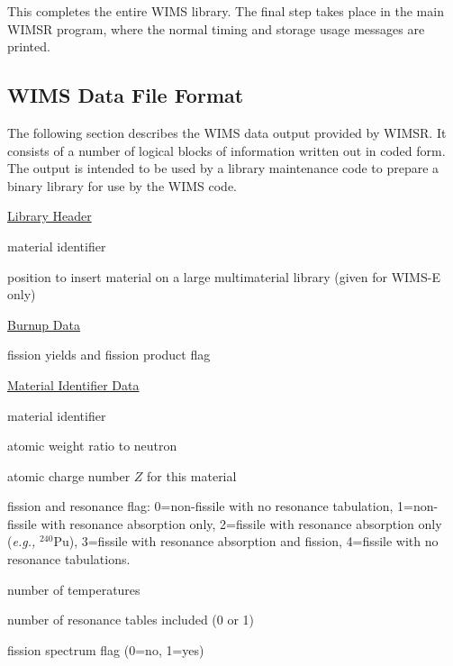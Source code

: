 This completes the entire WIMS library.  The final step takes place
in the main WIMSR program, where the normal timing and storage
usage messages are printed.


\subsection{WIMS Data File Format}
\label{ssWIMSR_fileformat}

The following section describes the WIMS data output provided
by WIMSR.  It consists of a number of logical blocks of
information written out in coded form.  The output is intended
to be used by a library maintenance code to prepare a binary
library for use by the WIMS code.

\noindent

\underline{Library Header }

\begin{list}{}{\setlength{\leftmargin}{2in}\setlength{\labelwidth}{1.7in}}
\item[\cword{NFID}\hfill] material identifier
\item[\cword{NPOS}\hfill] position to insert material on a
    large multimaterial library (given for WIMS-E only)
\end{list}

\noindent
\underline{Burnup Data }

\begin{list}{}{\setlength{\leftmargin}{2in}\setlength{\labelwidth}{1.7in}}
\item[\cword{(YIELD(I),IFISP(I),I=1,JCC/2}] fission yields and
   fission product flag
\end{list}

\noindent
\underline{Material Identifier Data }

\begin{list}{}{\setlength{\leftmargin}{2in}\setlength{\labelwidth}{1.7in}}
\item[\cword{IDENT}\hfill] material identifier
\item[\cword{AWR}\hfill] atomic weight ratio to neutron
\item[\cword{IZNUM}\hfill] atomic charge number $Z$ for this material
\item[\cword{IFIS}\hfill] fission and resonance flag: 0=non-fissile with
no resonance tabulation, 1=non-fissile with resonance absorption only,
2=fissile with resonance absorption only ({\it e.g.,} $^{240}$Pu),
3=fissile with resonance absorption and fission, 4=fissile with no
resonance tabulations.
\item[\cword{NTEMP}\hfill] number of temperatures
\item[\cword{NRESTB}\hfill] number of resonance tables included (0 or 1)
\item[\cword{ISOF}\hfill] fission spectrum flag (0=no, 1=yes)
\end{list}

